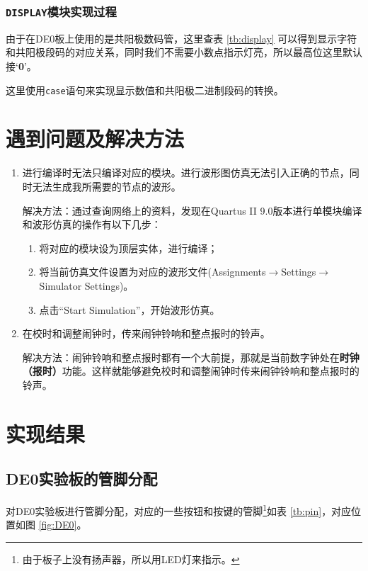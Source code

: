 \documentclass[12pt,AutoFakeBold]{article}
\begin{document}
\subsubsection{\texttt{DISPLAY}模块实现过程}
由于在DE0板上使用的是共阳极数码管，这里查表 \ref{tb:display} 可以得到显示字符和共阳极段码的对应关系，同时我们不需要小数点指示灯亮，所以最高位这里默认接‘\textbf{0}’。

这里使用\texttt{case}语句来实现显示数值和共阳极二进制段码的转换。


\section{遇到问题及解决方法}
\begin{enumerate}[\sffamily 1.]
    \item {\kaishu 进行编译时无法只编译对应的模块。进行波形图仿真无法引入正确的节点，同时无法生成我所需要的节点的波形。}
    
    {\heiti 解决方法：}通过查询网络上的资料，发现在Quartus II 9.0版本进行单模块编译和波形仿真的操作有以下几步：
    \begin{enumerate}[S1:]
        \item 将对应的模块设为顶层实体，进行编译；
        \item 将当前仿真文件设置为对应的波形文件(\textsf{Assignments}$\to$\textsf{Settings}$\to$\textsf{Simulator Settings})。
        \item 点击“\textsf{Start Simulation}”，开始波形仿真。
    \end{enumerate}
    \item {\kaishu 在校时和调整闹钟时，传来闹钟铃响和整点报时的铃声。}
    
    {\heiti 解决方法：}闹钟铃响和整点报时都有一个大前提，那就是当前数字钟处在\textsf{\textbf{时钟（报时）}}功能。这样就能够避免校时和调整闹钟时传来闹钟铃响和整点报时的铃声。
\end{enumerate}


\section{实现结果}\label{sec:result}
\subsection{DE0实验板的管脚分配}
对DE0实验板进行管脚分配，对应的一些按钮和按键的管脚\footnote{由于板子上没有扬声器，所以用LED灯来指示。}如表 \ref{tb:pin}，对应位置如图 \ref{fig:DE0}。
\end{document}

